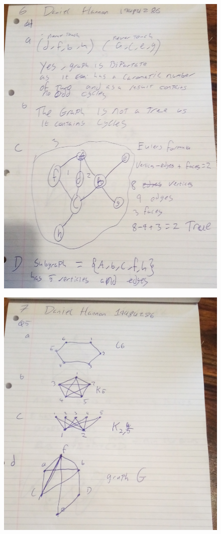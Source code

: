 \documentclass{article}
\begin{document}
	\begin{figure}
		\centering
		\includegraphics[width=\textwidth]{IMG_20210118_111950.jpg}
	\end{figure}
	\newpage
	\begin{figure}
		\centering
		\includegraphics[width=\textwidth]{IMG_20210118_112004.jpg}
	\end{figure}
\end{document}
